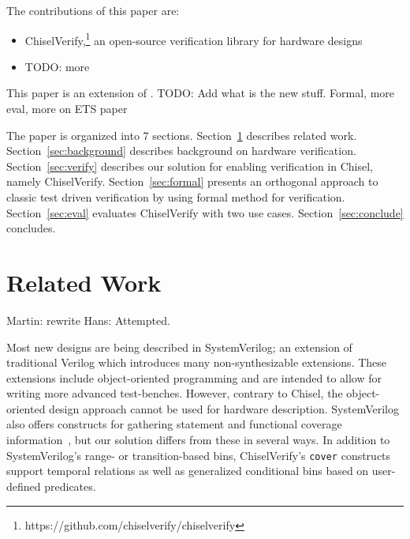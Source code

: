 \documentclass[conference]{IEEEtran}
\newcommand{\todo}[1]{{\color{olive} TODO: #1}}
\newcommand{\martin}[1]{{\color{blue} Martin: #1}}
\newcommand{\hjd}[1]{{\color{pink} Hans: #1}}
\begin{document}
The contributions of this paper are:

\begin{itemize}
\item ChiselVerify,\footnote{https://github.com/chiselverify/chiselverify} an open-source verification library for hardware designs
\item \todo{more}
\end{itemize}


This paper is an extension of \cite{ChiselVerify:2021}. \todo{Add what is the new stuff. Formal, more eval, more on ETS paper}

The paper is organized into 7 sections.
Section~\ref{sec:related} describes related work.
Section~\ref{sec:background} describes background on hardware verification.
Section~\ref{sec:verify} describes our solution for enabling verification in Chisel, namely ChiselVerify.
Section~\ref{sec:formal} presents an orthogonal approach to classic test driven verification by using formal
method for verification. 
Section~\ref{sec:eval} evaluates ChiselVerify with two use cases.
Section~\ref{sec:conclude} concludes.


\section{Related Work}
\label{sec:related}

\martin{rewrite} \hjd{Attempted.}



Most new designs are being described in SystemVerilog; an extension of traditional Verilog 
which introduces many non-synthesizable extensions. These extensions include object-oriented 
programming and are intended to allow for writing more advanced test-benches. However, 
contrary to Chisel, the object-oriented design approach cannot be used for hardware 
description. SystemVerilog also offers constructs for gathering statement and functional 
coverage information~\cite{spear2008systemverilog}, but our solution differs from these in 
several ways. In addition to SystemVerilog's range- or transition-based bins, 
ChiselVerify's \texttt{cover} constructs support temporal relations as well as generalized 
conditional bins based on user-defined predicates. 
\end{document}
